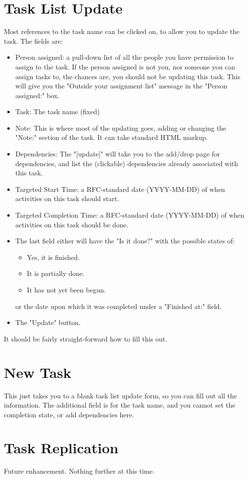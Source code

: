 \documentclass[captions=tablesignature]{scrartcl}
\begin{document}
\section{Task List Update}
\label{sec-5}
Most references to the task name can be clicked on, to allow you to
update the task.
The fields are:
\begin{itemize}
\item Person assigned: a pull-down list of all the people you have
permission to assign to the task.  If the person assigned is not
you, nor someone you can assign tasks to, the chances are, you
should not be updating this task.  This will give you the "Outside
your assignment list" message in the "Person assigned:" box.
\item Task: The task name (fixed)
\item Note: This is where most of the updating goes, adding or changing
the "Note:" section of the task.  It can take standard HTML
markup.
\item Dependencies: The "[update]" will take you to the add/drop page
for dependencies, and list the (clickable) dependencies already
associated with this task.
\item Targeted Start Time: a RFC-standard date (YYYY-MM-DD) of when
activities on this task should start.
\item Targeted Completion Time: a RFC-standard date (YYYY-MM-DD) of when
activities on this task should be done.
\item The last field either will have the "Is it done?" with the
possible states of:
\begin{itemize}
\item Yes, it is finished.
\item It is partially done.
\item It has not yet been begun.
\end{itemize}
or the date upon which it was completed under a "Finished at:"
field.
\item The "Update" button.
\end{itemize}
It should be fairly straight-forward how to fill this out.

\section{New Task}
\label{sec-6}
This just takes you to a blank task list update form, so you can
fill out all the information.  The additional field is for the task
name, and you cannot set the completion state, or add dependencies
here.

\section{Task Replication}
\label{sec-7}
Future enhancement.  Nothing further at this time.
\end{document}
